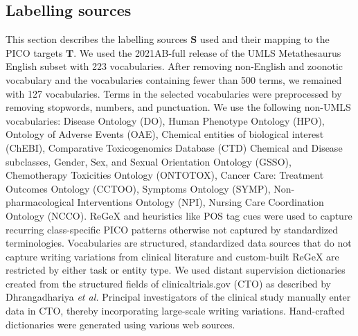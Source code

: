 \documentclass[10.7pt,]{article}
\begin{document}
\subsection{Labelling sources}\label{lss}
%
This section describes the labelling sources $\bm{S}$ used and their mapping to the PICO targets $\bm{T}$.
We used the 2021AB-full release of the UMLS Metathesaurus English subset with 223 vocabularies.
After removing non-English and zoonotic vocabulary and the vocabularies containing fewer than 500 terms, we remained with 127 vocabularies.\cite{humphreys1998unified}
Terms in the selected vocabularies were preprocessed by removing stopwords, numbers, and punctuation.
We use the following non-UMLS vocabularies: Disease Ontology (DO), Human Phenotype Ontology (HPO), Ontology of Adverse Events (OAE), Chemical entities of biological interest (ChEBI),  Comparative Toxicogenomics Database (CTD) Chemical and Disease subclasses, Gender, Sex, and Sexual Orientation Ontology (GSSO), Chemotherapy Toxicities Ontology (ONTOTOX), Cancer Care: Treatment Outcomes Ontology (CCTOO), Symptoms Ontology (SYMP), Non-pharmacological Interventions Ontology (NPI), Nursing Care Coordination Ontology (NCCO).\cite{schriml2012disease,robinson2008human,he2014oae,de2010chemical,kronk2020development,geifman2011towards,rogier2021using,lin2018cancer,mohammed2012building,ninot2018definition}
ReGeX and heuristics like POS tag cues were used to capture recurring class-specific PICO patterns otherwise not captured by standardized terminologies.
Vocabularies are structured, standardized data sources that do not capture writing variations from clinical literature and custom-built ReGeX are restricted by either task or entity type.\cite{ratner2017snorkel,safranchik2020weakly}
We used distant supervision dictionaries created from the structured fields of clinicaltrials.gov (CTO) as described by Dhrangadhariya \textit{et al.}\cite{dhrangadhariya2022distant}
Principal investigators of the clinical study manually enter data in CTO, thereby incorporating large-scale writing variations.\cite{califf2012characteristics}
Hand-crafted dictionaries were generated using various web sources.
%
%
%
\end{document}

